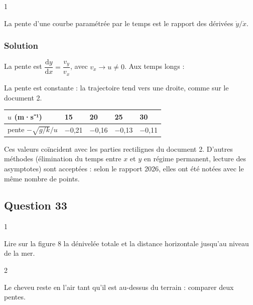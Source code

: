 \documentclass[11pt,a4paper]{article}
\newcommand{\equationajustee}[1]{%
  \sbox{\boiteequation}{$\displaystyle #1$}%
  \ifdim\wd\boiteequation>\linewidth
    \[\resizebox{\linewidth}{!}{\usebox{\boiteequation}}\]%
  \else
    \[#1\]%
  \fi}
\begin{document}
\begin{indication}{1}

La pente d'une courbe paramétrée par le temps est le rapport des dérivées \(\dot y/\dot x\).

\end{indication}

\hypertarget{solution-31}{%
\subsubsection{Solution}\label{solution-31}}

La pente est \(\dfrac{\mathrm{d}y}{\mathrm{d}x} = \dfrac{v_y}{v_x}\), avec \(v_x \to u \neq 0\). Aux temps longs :

\equationajustee{\boxed{\left(\frac{\mathrm{d}y}{\mathrm{d}x}\right)_\infty = -\frac{1}{u}\sqrt{\frac{g}{k}}}}

La pente est constante : la trajectoire tend vers une droite, comme sur le document 2.

\begin{longtable}[]{@{}lllll@{}}
\toprule\noalign{}
\(u\) (m·s⁻¹) & 15 & 20 & 25 & 30 \\
\midrule\noalign{}
\endhead
\bottomrule\noalign{}
\endlastfoot
pente \(-\sqrt{g/k}/u\) & −0,21 & −0,16 & −0,13 & −0,11 \\
\end{longtable}

Ces valeurs coïncident avec les parties rectilignes du document 2. D'autres méthodes (élimination du temps entre \(x\) et \(y\) en régime permanent, lecture des asymptotes) sont acceptées : selon le rapport 2026, elles ont été notées avec le même nombre de points.

\hypertarget{question-33}{%
\subsection{Question 33}\label{question-33}}

\begin{indication}{1}

Lire sur la figure 8 la dénivelée totale et la distance horizontale jusqu'au niveau de la mer.

\end{indication}

\begin{indication}{2}

Le cheveu reste en l'air tant qu'il est au-dessus du terrain : comparer deux pentes.

\end{indication}
\end{document}
